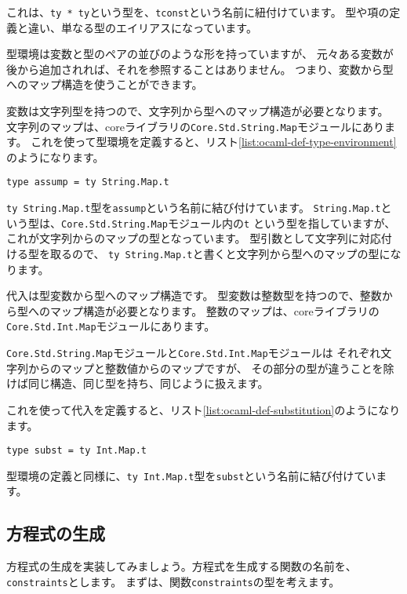 これは、\texttt{ty * ty}という型を、\texttt{tconst}という名前に紐付けています。
型や項の定義と違い、単なる型のエイリアスになっています。

型環境は変数と型のペアの並びのような形を持っていますが、
元々ある変数が後から追加されれば、それを参照することはありません。
つまり、変数から型へのマップ構造を使うことができます。

変数は文字列型を持つので、文字列から型へのマップ構造が必要となります。
文字列のマップは、coreライブラリの\texttt{Core.Std.String.Map}モジュールにあります。
これを使って型環境を定義すると、リスト\ref{list:ocaml-def-type-environment}のようになります。

\begin{lstlisting}[caption=型環境の定義, label=list:ocaml-def-type-environment]
type assump = ty String.Map.t
\end{lstlisting}

\texttt{ty String.Map.t}型を\texttt{assump}という名前に結び付けています。
\texttt{String.Map.t}という型は、\texttt{Core.Std.String.Map}モジュール内の\texttt{t}
という型を指していますが、これが文字列からのマップの型となっています。
型引数として文字列に対応付ける型を取るので、
\texttt{ty String.Map.t}と書くと文字列から型へのマップの型になります。

代入は型変数から型へのマップ構造です。
型変数は整数型を持つので、整数から型へのマップ構造が必要となります。
整数のマップは、coreライブラリの\texttt{Core.Std.Int.Map}モジュールにあります。

\texttt{Core.Std.String.Map}モジュールと\texttt{Core.Std.Int.Map}モジュールは
それぞれ文字列からのマップと整数値からのマップですが、
その部分の型が違うことを除けば同じ構造、同じ型を持ち、同じように扱えます。

これを使って代入を定義すると、リスト\ref{list:ocaml-def-substitution}のようになります。

\begin{lstlisting}[caption=代入の定義, label=list:ocaml-def-substitution]
type subst = ty Int.Map.t
\end{lstlisting}

型環境の定義と同様に、\texttt{ty Int.Map.t}型を\texttt{subst}という名前に結び付けています。

\subsection{方程式の生成}

方程式の生成を実装してみましょう。方程式を生成する関数の名前を、\texttt{constraints}とします。
まずは、関数\texttt{constraints}の型を考えます。

